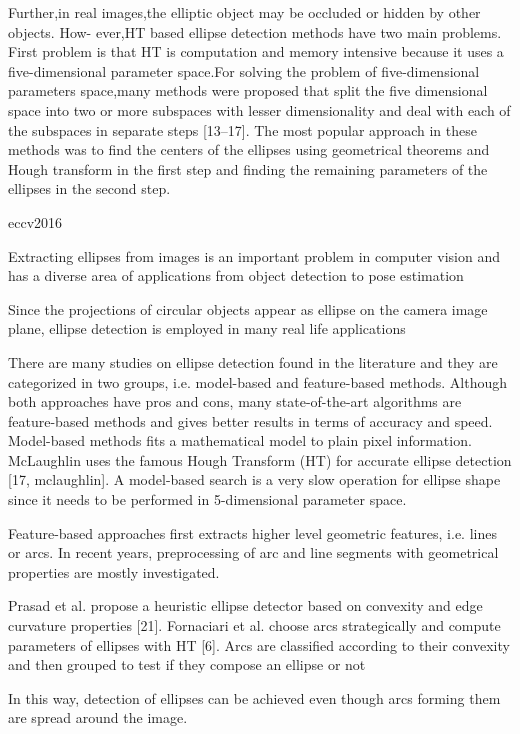 \documentclass[a4paper]{report}
\begin{document}
Further,in real images,the
elliptic object may be occluded or hidden by other objects.
How-
ever,HT based ellipse detection methods have two main problems.
First problem is that HT is computation and memory intensive
because it uses a five-dimensional parameter space.For solving the
problem of five-dimensional parameters space,many methods were
proposed that split the five dimensional space into two or more
subspaces with lesser dimensionality and deal with each of the
subspaces in separate steps [13–17]. The most popular approach in
these methods was to find the centers of the ellipses using
geometrical theorems and Hough transform in the first step and
finding the remaining parameters of the ellipses in the second step.


eccv2016

Extracting ellipses from images is an important problem in computer vision and
has a diverse area of applications from object detection to pose estimation

Since the projections of circular objects appear as ellipse on the
camera image plane, ellipse detection is employed in many real life applications

There are many studies on ellipse detection found in the literature and
they are categorized in two groups, i.e. model-based and feature-based methods.
Although both approaches have pros and cons, many state-of-the-art algorithms
are feature-based methods and gives better results in terms of accuracy and
speed. Model-based methods fits a mathematical model to plain pixel information.
McLaughlin uses the famous Hough Transform (HT) for accurate ellipse
detection [17, mclaughlin]. A model-based search is a very slow operation for ellipse shape
since it needs to be performed in 5-dimensional parameter space.

Feature-based
approaches first extracts higher level geometric features, i.e. lines or arcs. In
recent years, preprocessing of arc and line segments with geometrical properties
are mostly investigated.

Prasad et al. propose a heuristic ellipse
detector based on convexity and edge curvature properties [21]. Fornaciari et al.
choose arcs strategically and compute parameters of ellipses with HT [6]. Arcs are
classified according to their convexity and then grouped to test if they compose
an ellipse or not

In this way, detection of
ellipses can be achieved even though arcs forming them are spread around
the image.
\end{document}
